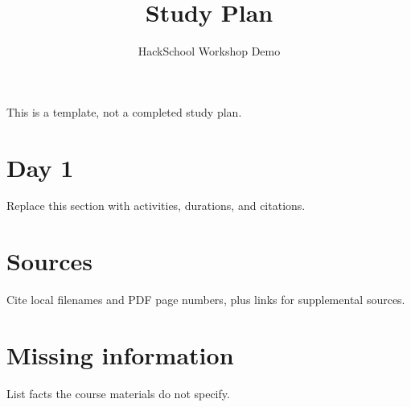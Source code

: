 \documentclass[11pt]{article}
\title{Study Plan}
\author{HackSchool Workshop Demo}
\date{}
\begin{document}
\maketitle
\noindent This is a template, not a completed study plan.
\section*{Day 1}
Replace this section with activities, durations, and citations.
\section*{Sources}
Cite local filenames and PDF page numbers, plus links for supplemental sources.
\section*{Missing information}
List facts the course materials do not specify.
\end{document}
